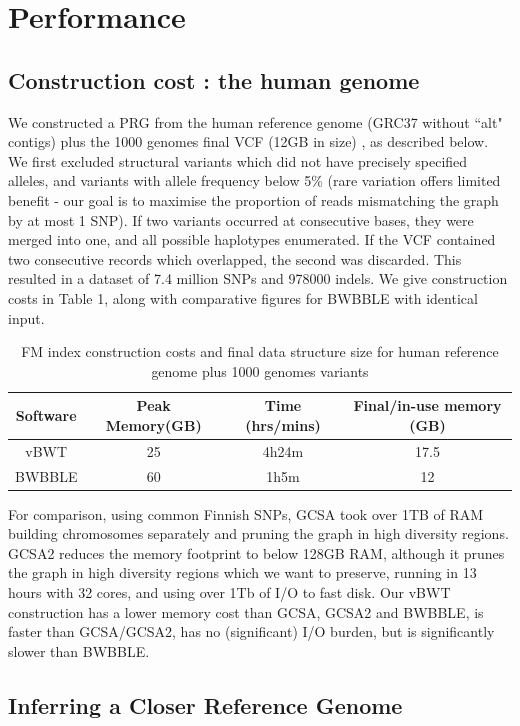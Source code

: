 \documentclass[runningheads,a4paper]{llncs}
\begin{document}
\section{Performance}
\subsection{Construction cost : the human genome}
We constructed a PRG from the human reference genome (GRC37 without ``alt" contigs) plus the 1000 genomes final VCF (12GB in size) \cite{1000g}, as described below. We first  excluded structural variants which did not have precisely specified alleles, and variants with allele frequency below 5\% (rare variation offers limited benefit - our goal is to maximise the proportion of reads mismatching the graph by at most 1 SNP). If two variants occurred at consecutive bases, they were merged into one, and all possible haplotypes enumerated. If the VCF contained two consecutive records which overlapped, the second was discarded. This resulted in a dataset of 7.4 million SNPs and 978000 indels. We give construction costs in Table 1, along with comparative figures for BWBBLE with identical input. 
 
\begin{table}
\caption{FM index construction costs and final data structure size for human reference genome plus 1000 genomes variants}
\centering
\begin{tabular}{c c c c}
\hline
Software  & Peak Memory(GB) & Time (hrs/mins) & Final/in-use memory (GB)\\
\hline
vBWT  & 25  & 4h24m & 17.5 \\
BWBBLE  & 60 &  1h5m  & 12\\ 
\hline
\end{tabular}
\end{table}

For comparison, using common Finnish SNPs, GCSA took over 1TB of RAM building chromosomes separately and pruning the graph in high diversity regions. GCSA2 reduces the memory footprint to below 128GB RAM, although it prunes the graph in high diversity regions which we want to preserve, running in 13 hours with 32 cores, and using  over 1Tb of I/O to fast disk. Our vBWT construction has a lower memory cost than GCSA, GCSA2 and BWBBLE, is faster than GCSA/GCSA2, has no (significant) I/O burden, but is significantly slower than BWBBLE. 



\subsection{Inferring a Closer Reference Genome}
\end{document}
